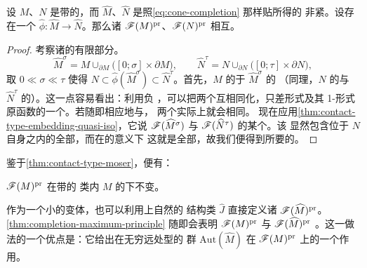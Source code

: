 \begin{corollary}\label{thm:cone-completion-quasiequivalence}
设 $M$、$N$ 是带\trContactTypeBoundary{}的\trExactSymplectic\trManifold，而
$\widehat{M}$、$\widehat{N}$ 是照\eqref{eq:cone-completion} 那样贴\trCone{}所得的%
非紧\trManifold。设存在一个\trExactSymplectic\trIsomorphism{}
$\hat{\phi}\colon\widehat{M}\to\widehat{N}$。那么诸\trCategory{}
$\mathscr{F}(M)^{\mathrm{pr}}$、$\mathscr{F}(N)^{\mathrm{pr}}$ 相互\trQuasiequivalence。
\end{corollary}
\begin{proof}
考察诸\trCompletion{}的有限部分。
\begin{equation*}
\widehat{M}^{\sigma}=M\cup_{\partial M}\bigl([0;\sigma]\times\partial M\bigr),
\qquad
\widehat{N}^{\tau}=N\cup_{\partial N}\bigl([0;\tau]\times\partial N\bigr),
\end{equation*}
取 $0\ll\sigma\ll\tau$ 使得 $N\subset\hat{\phi}(\widehat{M}^{\sigma})\subset
\widehat{N}^{\tau}$。首先，$M$ 的\trFukayaCategory{}\trQuasiequivalence{}于 $\widehat{M}^{\sigma}$ 的%
（同理，$N$ 的与 $\widehat{N}^{\tau}$ 的\trQuasiequivalence）。这一点容易看出：利用负%
\trLiouville{}\trFlow，可以把两个\trManifold{}互相同化，只差\trSymplectic{}形式及其%
1-形式原函数的一个\trConformal\trRescaling。若随即相应地\trRescaling\trFloerDatum{}与\trPerturbationDatum，%
两个\trFukayaCategory{}实际上就会相同。
现在应用\cref{thm:contact-type-embedding-quasi-iso}，它说 $\mathscr{F}(\widehat{M}^{\sigma})$
与 $\mathscr{F}(\widehat{N}^{\tau})$ 的某个\trFullSubcategory{}\trQuasiisomorphic。该\trSubcategory{}
显然包含位于 $N$ 自身之内的全部\trExact\trLagrange\trSubmanifold，而在\trIsotopy{}的意义下%
这就是全部，故我们便得到所要的\trQuasiequivalence。
\end{proof}
鉴于\cref{thm:contact-type-moser}，便有：
\begin{corollary}\label{thm:deformation-invariance-contact}
$\mathscr{F}(M)^{\mathrm{pr}}$ 在带\trContactTypeBoundary{}的\trExactSymplectic\trManifold{}%
类内 $M$ 的\trDeformation{}下不变。\noqed
\end{corollary}
\begin{remark}\label{thm:completion-contact-action-remark}
作为一个小的变体，也可以利用\trCompletion{}上自然的 \trAlmostComplex{}结构类
$\hat{J}$ 直接定义诸%
\trCategory{} $\mathscr{F}(\widehat{M})^{\mathrm{pr}}$。\cref{thm:completion-maximum-principle}
随即会表明 $\mathscr{F}(M)^{\mathrm{pr}}$ 与 $\mathscr{F}(\widehat{M})^{\mathrm{pr}}$
\trQuasiequivalence。这一做法的一个优点是：它给出在无穷远处\trContact{}型的%
\trExactSymplectic\trAutomorphism{}群 $\mathrm{Aut}(\widehat{M})$ 在
$\mathscr{F}(M)^{\mathrm{pr}}$ 上的一个\trCoherent{}作用。
\end{remark}
